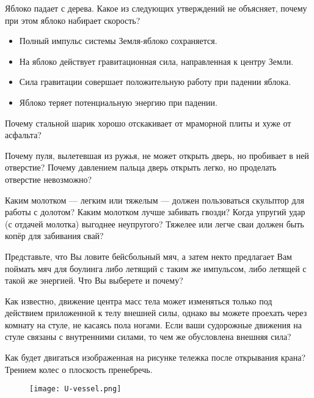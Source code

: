 \qualProblems

\begin{ex}
Яблоко падает с дерева. Какое из следующих утверждений не объясняет, почему при этом яблоко набирает скорость?
\begin{itemize}
\item Полный импульс системы Земля-яблоко сохраняется.
\item На яблоко действует гравитационная сила, направленная к центру Земли.
\item Сила гравитации совершает положительную работу при падении яблока.
\item Яблоко теряет потенциальную энергию при падении.
\end{itemize}
\end{ex}

\begin{ex}
Почему стальной шарик хорошо отскакивает от мраморной плиты и хуже от асфальта?
\end{ex}

\begin{ex}
Почему пуля, вылетевшая из ружья, не может открыть дверь, но пробивает в ней отверстие? Почему давлением пальца  дверь открыть легко, но проделать отверстие невозможно?
\end{ex}

\begin{ex}
Каким молотком — легким или тяжелым — должен пользоваться скульптор для работы с долотом? Каким молотком лучше забивать гвозди? Когда упругий удар (с отдачей молотка) выгоднее неупругого? Тяжелее или легче сваи должен быть копёр для забивания свай?
\end{ex}

\begin{ex}
Представьте, что Вы ловите бейсбольный мяч, а затем некто предлагает Вам поймать мяч для боулинга либо летящий с таким же импульсом, либо летящей с такой же энергией. Что Вы выберете и почему?
\end{ex}

\begin{ex}
Как известно, движение центра масс тела может изменяться только под действием приложенной к телу внешней силы, однако вы можете проехать через комнату на стуле, не касаясь пола ногами. Если ваши судорожные движения на стуле связаны с внутренними силами, то чем же обусловлена внешняя сила?
\end{ex}

\begin{ex}
Как будет двигаться изображенная на рисунке тележка после открывания крана? Трением колес о плоскость пренебречь.

\begin{figure}[h]
\centering
\texttt{[image: U-vessel.png]}
\caption{}
\label{U-vessel}
\end{figure}
\end{ex}

